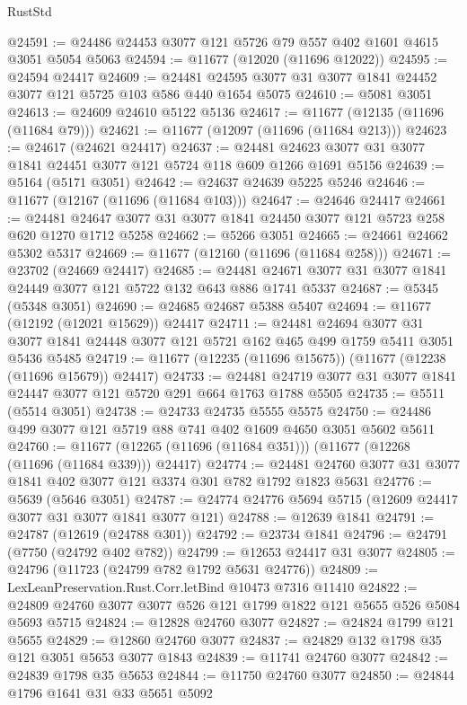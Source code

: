\begin{lexlean}{RustStd}
\begin{coremodule}
@24591 := @24486 @24453 @3077 @121 @5726 @79 @557 @402 @1601 @4615 @3051 @5054 @5063
@24594 := @11677 (@12020 (@11696 @12022))
@24595 := @24594 @24417
@24609 := @24481 @24595 @3077 @31 @3077 @1841 @24452 @3077 @121 @5725 @103 @586 @440 @1654 @5075
@24610 := @5081 @3051
@24613 := @24609 @24610 @5122 @5136
@24617 := @11677 (@12135 (@11696 (@11684 @79)))
@24621 := @11677 (@12097 (@11696 (@11684 @213)))
@24623 := @24617 (@24621 @24417)
@24637 := @24481 @24623 @3077 @31 @3077 @1841 @24451 @3077 @121 @5724 @118 @609 @1266 @1691 @5156
@24639 := @5164 (@5171 @3051)
@24642 := @24637 @24639 @5225 @5246
@24646 := @11677 (@12167 (@11696 (@11684 @103)))
@24647 := @24646 @24417
@24661 := @24481 @24647 @3077 @31 @3077 @1841 @24450 @3077 @121 @5723 @258 @620 @1270 @1712 @5258
@24662 := @5266 @3051
@24665 := @24661 @24662 @5302 @5317
@24669 := @11677 (@12160 (@11696 (@11684 @258)))
@24671 := @23702 (@24669 @24417)
@24685 := @24481 @24671 @3077 @31 @3077 @1841 @24449 @3077 @121 @5722 @132 @643 @886 @1741 @5337
@24687 := @5345 (@5348 @3051)
@24690 := @24685 @24687 @5388 @5407
@24694 := @11677 (@12192 (@12021 @15629)) @24417
@24711 := @24481
    @24694
    @3077
    @31
    @3077
    @1841
    @24448
    @3077
    @121
    @5721
    @162
    @465
    @499
    @1759
    @5411
    @3051
    @5436
    @5485
@24719 := @11677 (@12235 (@11696 @15675)) (@11677 (@12238 (@11696 @15679)) @24417)
@24733 := @24481 @24719 @3077 @31 @3077 @1841 @24447 @3077 @121 @5720 @291 @664 @1763 @1788 @5505
@24735 := @5511 (@5514 @3051)
@24738 := @24733 @24735 @5555 @5575
@24750 := @24486 @499 @3077 @121 @5719 @88 @741 @402 @1609 @4650 @3051 @5602 @5611
@24760 := @11677 (@12265 (@11696 (@11684 @351))) (@11677 (@12268 (@11696 (@11684 @339))) @24417)
@24774 := @24481 @24760 @3077 @31 @3077 @1841 @402 @3077 @121 @3374 @301 @782 @1792 @1823 @5631
@24776 := @5639 (@5646 @3051)
@24787 := @24774 @24776 @5694 @5715 (@12609 @24417 @3077 @31 @3077 @1841 @3077 @121)
@24788 := @12639 @1841
@24791 := @24787 (@12619 (@24788 @301))
@24792 := @23734 @1841
@24796 := @24791 (@7750 (@24792 @402 @782))
@24799 := @12653 @24417 @31 @3077
@24805 := @24796 (@11723 (@24799 @782 @1792 @5631 @24776))
@24809 := LexLeanPreservation.Rust.Corr.letBind @10473 @7316 @11410
@24822 := @24809 @24760 @3077 @3077 @526 @121 @1799 @1822 @121 @5655 @526 @5084 @5693 @5715
@24824 := @12828 @24760 @3077
@24827 := @24824 @1799 @121 @5655
@24829 := @12860 @24760 @3077
@24837 := @24829 @132 @1798 @35 @121 @3051 @5653 @3077 @1843
@24839 := @11741 @24760 @3077
@24842 := @24839 @1798 @35 @5653
@24844 := @11750 @24760 @3077
@24850 := @24844 @1796 @1641 @31 @33 @5651 @5092

\end{coremodule}
\end{lexlean}
